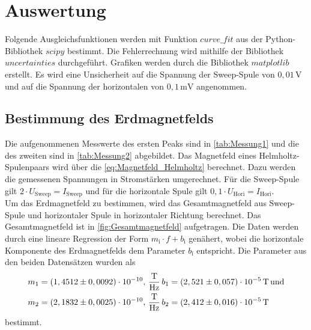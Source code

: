 \section{Auswertung}
\label{sec:auswertung}

Folgende Ausgleichsfunktionen werden mit Funktion $curve\_fit$ aus der Python\cite{py}-Bibliothek $scipy$\cite{2020SciPy-NMeth} bestimmt.
Die Fehlerrechnung wird mithilfe der Bibliothek $uncertainties$ \cite{unp} durchgeführt.
Grafiken werden durch die Bibliothek $matplotlib$\cite{Hunter:2007} erstellt. 
Es wird eine Unsicherheit auf die Spannung der Sweep-Spule von $0,01 \, \unit{\volt}$ und auf die Spannung der horizontalen von $0,1 \, \unit{\milli\volt} $ angenommen.

\subsection{Bestimmung des Erdmagnetfelds}

Die aufgenommenen Messwerte des ersten Peaks sind in \autoref{tab:Messung1} und die des zweiten sind in \autoref{tab:Messung2} abgebildet.
Das Magnetfeld eines Helmholtz-Spulenpaars wird über die \eqref{eq:Magnetfeld_Helmholtz} berechnet.
Dazu werden die gemessenen Spannungen in Stromstärken umgerechnet.
Für die Sweep-Spule gilt $2 \cdot U_\text{Sweep} = I_\text{Sweep}$ und für die horizontale Spule gilt $0,1 \cdot U_\text{Hori} = I_\text{Hori}$.\\
Um das Erdmagnetfeld zu bestimmen, wird das Gesamtmagnetfeld aus Sweep-Spule und horizontaler Spule in horizontaler Richtung berechnet.
Das Gesamtmagnetfeld ist in \autoref{fig:Gesamtmagnetfeld} aufgetragen. 
Die Daten werden durch eine lineare Regression der Form $m_\text{i} \cdot f + b_\text{i}$ genähert,
wobei die horizontale Komponente des Erdmagnetfelds dem Parameter $b_\text{i}$ entspricht.
Die Parameter aus den beiden Datensätzen wurden als 
\begin{align*}
    &m_1 =   \left( 1,4512 \pm 0,0092 \right) \cdot 10^{-10},\, \unit{\dfrac{\tesla}{\hertz}} \, b_1 = \left( 2,521  \pm 0,057 \right) \cdot 10^{-5}\, \unit{\tesla} \, \text{und} \\
    &m_2 =   \left( 2,1832 \pm 0,0025 \right) \cdot 10^{-10},\, \unit{\dfrac{\tesla}{\hertz}} \, b_2 = \left( 2,412  \pm 0,016 \right) \cdot 10^{-5}\, \unit{\tesla} \\
\end{align*}
bestimmt.


